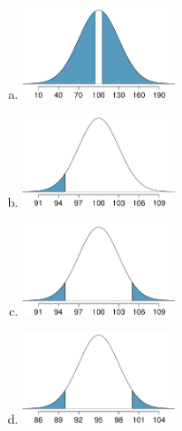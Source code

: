 \documentclass[slidestop,compress,mathserif,12pt,t,professionalfonts,xcolor=table]{beamer}
\begin{document}

\begin{frame}
\frametitle{}


\begin{multicols}{2}
\begin{enumerate}[(a)]
\item \includegraphics[width=0.35\textwidth]{figures/ht_curves/a}
\item \includegraphics[width=0.35\textwidth]{figures/ht_curves/b}
\item \includegraphics[width=0.35\textwidth]{figures/ht_curves/c}
\item \includegraphics[width=0.35\textwidth]{figures/ht_curves/d}
\end{enumerate}
\end{multicols}

\end{frame}

\end{document}
